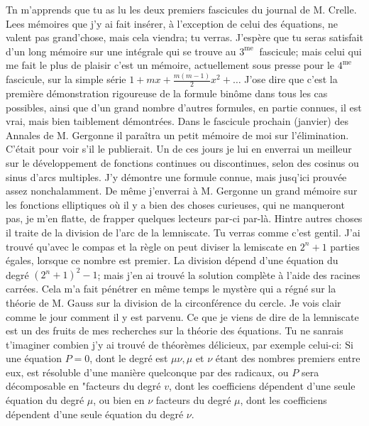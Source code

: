 \documentclass{article}
\begin{document}
Tn m'apprends que tu as lu les deux premiers fascicules du journal de M. Crelle. Lees mémoires que j'y ai fait insérer, à l'exception de celui des équations, ne valent pas grand'chose, mais cela viendra; tu verras. J'espère que tu seras satisfait d'un long mémoire sur une intégrale qui se trouve au \(3^{\text {me }}\) fascicule; mais celui qui me fait le plus de plaisir c'est un mémoire, actuellement sous presse pour le \(4^{\text {me }}\) fascicule, sur la simple série \(1+m x+\frac{m(m-1)}{2} x^{2}+\ldots\) J'ose dire que c'est la première démonstration rigoureuse de la formule binôme dans tous les cas possibles, ainsi que d'un grand nombre d'autres formules, en partie connues, il est vrai, mais bien taiblement démontrées. Dans le fascicule prochain (janvier) des Annales de M. Gergonne il paraîtra un petit mémoire de moi sur l'élimination. C'était pour voir s'il le publierait. Un de ces jours je lui en enverrai un meilleur sur le développement de fonctions continues ou discontinues, selon des cosinus ou sinus d'arcs multiples. J'y démontre une formule connue, mais jusq'ici prouvée assez nonchalamment. De même j'enverrai à M. Gergonne un grand mémoire sur les fonctions elliptiques où il \(\mathrm{y}\) a bien des choses curieuses, qui ne manqueront pas, je m'en flatte, de frapper quelques lecteurs par-ci par-là. Hintre autres choses il traite de la division de l'arc de la lemniscate. Tu verras comme c'est gentil. J'ai trouvé qu'avec le compas et la règle on peut diviser la lemiscate en \(2^{n}+1\) parties égales, lorsque ce nombre est premier. La division dépend d'une équation du degré \(\left(2^{n}+1\right)^{2}-1\); mais j'en ai trouvé la solution complète à l'aide des racines carrées. Cela m'a fait pénétrer en même temps le mystère qui a régné sur la théorie de M. Gauss sur la division de la circonférence du cercle. Je vois clair comme le jour comment il y est parvenu. Ce que je viens de dire de la lemniscate est un des
fruits de mes recherches sur la théorie des équations. Tu ne sanrais t'imaginer combien j'y ai trouvé de théorèmes délicieux, par exemple celui-ci: \(\mathrm{Si}\) une équation \(P=0\), dont le degré est \(\mu \nu, \mu\) et \(\nu\) étant des nombres premiers entre eux, est résoluble d'une manière quelconque par des radicaux, ou \(P\) sera décomposable en "facteurs du degré \(v\), dont les coefficiens dépendent d'une seule équation du degré \(\mu\), ou bien en \(\nu\) facteurs du degré \(\mu\), dont les coefficiens dépendent d'une seule équation du degré \(\nu\).
\end{document}
